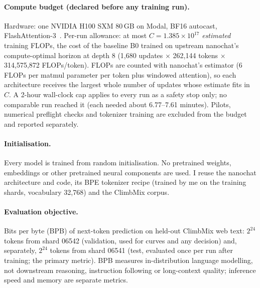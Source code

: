 \documentclass[10pt,twocolumn]{article}
\newcommand{\BO}{B0}
\begin{document}
\paragraph{Compute budget (declared before any training run).} Hardware: one NVIDIA H100 SXM 80\,GB on Modal, BF16
autocast, FlashAttention-3~\cite{shah2024flashattention3}. Per-run allowance: at most $C = 1.385\times10^{17}$
\emph{estimated} training FLOPs, the cost of the baseline \BO{} trained on upstream nanochat's compute-optimal horizon
at depth 8 (1{,}680 updates $\times$ 262{,}144 tokens $\times$ 314{,}575{,}872 FLOPs/token). FLOPs are counted with
nanochat's estimator (6 FLOPs per matmul parameter per token plus windowed attention), so each architecture receives
the largest whole number of updates whose estimate fits in $C$. A 2-hour wall-clock cap applies to every run as a
safety stop only; no comparable run reached it (each needed about 6.77--7.61 minutes). Pilots, numerical preflight
checks and tokenizer training are excluded from the budget and reported separately.

\paragraph{Initialisation.} Every model is trained from random initialisation. No pretrained weights, embeddings or
other pretrained neural components are used. I reuse the nanochat architecture and code, its BPE tokenizer recipe
(trained by me on the training shards, vocabulary 32{,}768) and the ClimbMix corpus.

\paragraph{Evaluation objective.} Bits per byte (BPB) of next-token prediction on held-out ClimbMix web text: $2^{24}$
tokens from shard 06542 (validation, used for curves and any decision) and, separately, $2^{24}$ tokens from shard
06541 (test, evaluated once per run after training; the primary metric). BPB measures in-distribution language
modelling, not downstream reasoning, instruction following or long-context quality; inference speed and memory are
separate metrics.

\end{document}
